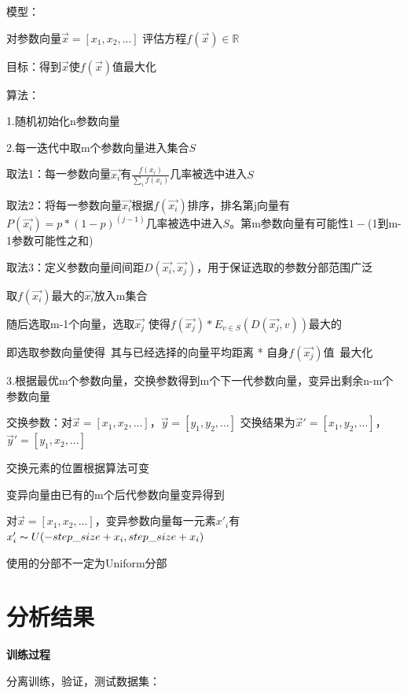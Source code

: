 \documentclass[UTF8]{ctexart}
\begin{document}
  模型：

  \quad 对参数向量$\vec{x} = [x_1, x_2, ...]$ 评估方程$f(\vec{x}) \in \mathbb{R} $

  目标：得到$\vec{x}$使$f(\vec{x})$值最大化

  算法：

  \quad 1.随机初始化n参数向量

  \quad 2.每一迭代中取m个参数向量进入集合$S$

  \quad \quad 取法1：每一参数向量$\vec{x_i}$有$\frac{f(x_i)}{\sum_i f(x_i)}$几率被选中进入$S$

  \quad \quad 取法2：将每一参数向量$\vec{x_i}$根据$f(\vec{x_i})$排序，排名第j向量有$P(\vec{x_i}) = p * (1-p)^(j-1)$几率被选中进入$S$。第m参数向量有可能性$1-$(1到m-1参数可能性之和)

  \quad \quad 取法3：定义参数向量间间距$D(\vec{x_i}, \vec{x_j})$，用于保证选取的参数分部范围广泛

  \quad \quad \quad 取$f(\vec{x_i})$最大的$\vec{x_i}$放入m集合

  \quad \quad \quad 随后选取m-1个向量，选取$\vec{x_j}$ 使得$f(\vec{x_j}) * E_{v \in S}(D(\vec{x_j}, v))$最大的

  \quad \quad \quad 即选取参数向量使得\ 其与已经选择的向量平均距离 * 自身$f(\vec{x_j})$值\ 最大化

  \quad 3.根据最优m个参数向量，交换参数得到m个下一代参数向量，变异出剩余n-m个参数向量

  \quad \quad 交换参数：对$\vec{x} = [x_1, x_2, ...]$，$\vec{y} = [y_1, y_2, ...]$ 交换结果为$\vec{x}' = [x_1, y_2, ...]$，$\vec{y}' = [y_1, x_2, ...]$

  \quad \quad \quad 交换元素的位置根据算法可变

  \quad \quad 变异向量由已有的m个后代参数向量变异得到

  \quad \quad \quad 对$\vec{x} = [x_1, x_2, ...]$，变异参数向量每一元素$x'_i$有$x'_i \thicksim U(-step\_size + x_i, step\_size + x_i)$

  \quad \quad \quad 使用的分部不一定为Uniform分部

  
\section{分析结果}
\noindent \textbf{训练过程}

  分离训练，验证，测试数据集：
  
\end{document}
